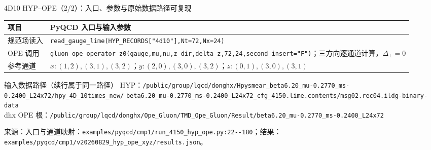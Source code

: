 \documentclass[UTF8,aspectratio=169,11pt]{ctexbeamer}
\newcommand{\source}[1]{\vspace{0.05em}\par{\raggedright\scriptsize\color{muted}来源：#1\par}}
\newcommand{\codepath}[1]{\nolinkurl{#1}}
\begin{document}
\begin{frame}[t]{4D10 HYP--OPE（2/2）：入口、参数与原始数据路径可复现}
  \footnotesize
  \setlength{\tabcolsep}{3pt}
  \begin{tabularx}{0.96\textwidth}{@{}P{0.22\textwidth}Y@{}}
    \toprule
    项目 & PyQCD 入口与输入参数 \\
    \midrule
    规范场读入 & \codepath{read_gauge_lime(HYP_RECORDS["4d10"],Nt=72,Nx=24)} \\
    OPE 调用 & \codepath{gluon_ope_operator_z0(gauge,mu,nu,z_dir,delta_z,72,24,second_insert="F")}；三方向逐通道计算，$\Delta_\perp=0$ \\
    参考通道 & $x:(1,2),(3,1),(3,2)$；$y:(2,0),(3,0),(3,2)$；$z:(0,1),(3,0),(3,1)$ \\
    \bottomrule
  \end{tabularx}
  \vspace{0.18em}
  \begin{block}{输入数据路径（续行属于同一路径）}
    \scriptsize
    HYP：\codepath{/public/group/lqcd/donghx/Hpysmear_beta6.20_mu-0.2770_ms-0.2400_L24x72/hpy_4D_10times_new/}\newline
    \hspace*{2.7em}\codepath{beta6.20_mu-0.2770_ms-0.2400_L24x72_cfg_4150.lime.contents/msg02.rec04.ildg-binary-data}\\
    dhx OPE 根：\codepath{/public/group/lqcd/donghx/Ope_Gluon/TMD_Ope_Gluon/Result/beta6.20_mu-0.2770_ms-0.2400_L24x72}
  \end{block}
  \source{入口与通道映射：\codepath{examples/pyqcd/cmp1/run_4150_hyp_ope.py:22--180}；结果：\codepath{examples/pyqcd/cmp1/v20260829_hyp_ope_xyz/results.json}。}
\end{frame}
\end{document}
